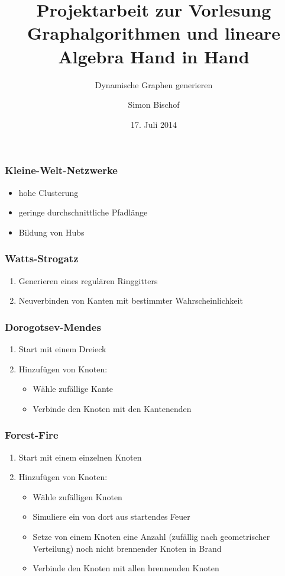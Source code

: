 \documentclass{beamer}
\author{Simon Bischof}
\title{Projektarbeit zur Vorlesung \glqq Graphalgorithmen und lineare Algebra Hand in Hand\grqq}
\subtitle{\glqq Dynamische Graphen generieren\grqq}
\date{17. Juli 2014}
\begin{document}

\begin{frame}
  \titlepage
\end{frame}

\begin{frame}
\frametitle{Kleine-Welt-Netzwerke}
\begin{itemize}
\item hohe Clusterung
\item geringe durchschnittliche Pfadlänge
\item Bildung von Hubs
\end{itemize}
\end{frame}

\begin{frame}
\frametitle{Watts-Strogatz}
\begin{enumerate}
\item Generieren eines regulären Ringgitters
\item Neuverbinden von Kanten mit bestimmter Wahrscheinlichkeit
\end{enumerate}
\end{frame}

\begin{frame}
\frametitle{Dorogotsev-Mendes}
\begin{enumerate}
\item Start mit einem Dreieck
\item Hinzufügen von Knoten:\pause
\begin{itemize}
\item Wähle zufällige Kante
\item Verbinde den Knoten mit den Kantenenden
\end{itemize}
\end{enumerate}
\end{frame}

\begin{frame}
\frametitle{Forest-Fire}
\begin{enumerate}
\item Start mit einem einzelnen Knoten
\item Hinzufügen von Knoten:\pause
\begin{itemize}
\item Wähle zufälligen Knoten
\item Simuliere ein von dort aus startendes Feuer\pause
\item Setze von einem Knoten eine Anzahl (zufällig nach geometrischer Verteilung) noch nicht brennender Knoten in Brand
\item Verbinde den Knoten mit allen brennenden Knoten
\end{itemize}
\end{enumerate}
\end{frame}
\end{document}
